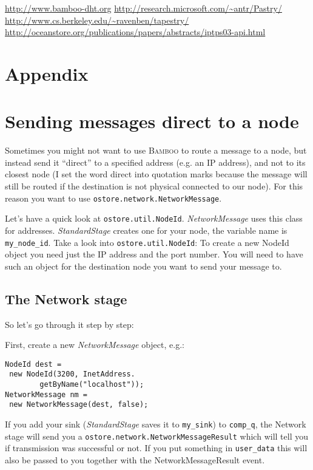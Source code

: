 \documentclass[twocolumn, twoside, a4paper]{article}
\begin{document}
\begin{thebibliography}{99}
 \url{http://www.bamboo-dht.org}
 \url{http://research.microsoft.com/~antr/Pastry/}
 \url{http://www.cs.berkeley.edu/~ravenben/tapestry/}
  \url{http://oceanstore.org/publications/papers/abstracts/iptps03-api.html}
\end{thebibliography}

\appendix
\section*{Appendix}
\label{sec:appendix}

\section{Sending messages direct to a node}
\label{sec:networkmessage}

Sometimes you might not want to use \textsc{Bamboo} to route a message to a node,
but instead send it ``direct'' to a specified address (e.g. an IP address),
and not to its closest node (I set the word direct into quotation
marks because the message will still be routed if the destination is
not physical connected to our node). For this reason you want to use
\texttt{ostore.network.NetworkMessage}.

Let's have a quick look at \texttt{ostore.util.NodeId}. \emph{NetworkMessage}
uses this class for addresses. \emph{StandardStage} creates one for your node,
the variable name is \texttt{my\_node\_id}. Take a look into
\texttt{ostore.util.NodeId}: To create a new NodeId object you need just
the IP address and the port number. You will need to have such an object
for the destination node you want to send your message to.


\subsection{The Network stage}
\label{sec:networkmessage:sec:networkstage}

So let's go through it step by step:

First, create a new \emph{NetworkMessage} object, e.g.:
\begin{lstlisting}  
NodeId dest = 
 new NodeId(3200, InetAddress.
        getByName("localhost"));
NetworkMessage nm = 
 new NetworkMessage(dest, false);
\end{lstlisting}
If you add your sink
(\emph{StandardStage} saves it to \texttt{my\_sink}) to
\texttt{comp\_q}, the Network stage will send you a
\texttt{ostore.network.NetworkMessageResult} which will tell you if
transmission was successful or not. If you put something in
\texttt{user\_data} this will also be passed to you together with the
NetworkMessageResult event.
\end{document}
